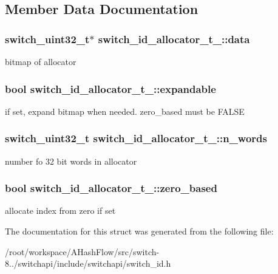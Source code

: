 \subsection{Member Data Documentation}
\hypertarget{structswitch__id__allocator__t___a3b40d71c7121a6ec4a1e834cafee25d5}{
\subsubsection[{data}]{\setlength{\rightskip}{0pt plus 5cm}switch\+\_\+uint32\+\_\+t$\ast$ switch\+\_\+id\+\_\+allocator\+\_\+t\+\_\+\+::data}}\label{structswitch__id__allocator__t___a3b40d71c7121a6ec4a1e834cafee25d5}
bitmap of allocator \hypertarget{structswitch__id__allocator__t___ae9d5d35cf95c82c05c1d5315edca6c34}{
\subsubsection[{expandable}]{\setlength{\rightskip}{0pt plus 5cm}bool switch\+\_\+id\+\_\+allocator\+\_\+t\+\_\+\+::expandable}}\label{structswitch__id__allocator__t___ae9d5d35cf95c82c05c1d5315edca6c34}
if set, expand bitmap when needed. zero\+\_\+based must be F\+A\+L\+S\+E \hypertarget{structswitch__id__allocator__t___ad1a0dcf013819fc1b61345f44d9392f1}{
\subsubsection[{n\+\_\+words}]{\setlength{\rightskip}{0pt plus 5cm}switch\+\_\+uint32\+\_\+t switch\+\_\+id\+\_\+allocator\+\_\+t\+\_\+\+::n\+\_\+words}}\label{structswitch__id__allocator__t___ad1a0dcf013819fc1b61345f44d9392f1}
number fo 32 bit words in allocator \hypertarget{structswitch__id__allocator__t___ab72fd8f75212b68abb7adb915793039c}{
\subsubsection[{zero\+\_\+based}]{\setlength{\rightskip}{0pt plus 5cm}bool switch\+\_\+id\+\_\+allocator\+\_\+t\+\_\+\+::zero\+\_\+based}}\label{structswitch__id__allocator__t___ab72fd8f75212b68abb7adb915793039c}
allocate index from zero if set 

The documentation for this struct was generated from the following file\+:\begin{DoxyCompactItemize}
\item 
/root/workspace/\+A\+Hash\+Flow/src/switch-\/8../switchapi/include/switchapi/switch\+\_\+id.\+h\end{DoxyCompactItemize}
